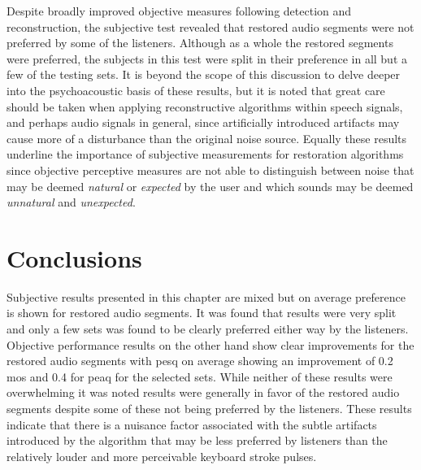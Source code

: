 
Despite broadly improved objective measures following detection and reconstruction, the subjective test revealed that restored audio segments were not preferred by some of the listeners. Although as a whole the restored segments were preferred, the subjects in this test were split in their preference in all but a few of the testing sets. It is beyond the scope of this discussion to delve deeper into the psychoacoustic basis of these results, but it is noted that great care should be taken when applying reconstructive algorithms within speech signals, and perhaps audio signals in general, since artificially introduced artifacts may cause more of a disturbance than the original noise source. Equally these results underline the importance of subjective measurements for restoration algorithms since objective perceptive measures are not able to distinguish between noise that may be deemed \emph{natural} or \emph{expected} by the user and which sounds may be deemed \emph{unnatural} and \emph{unexpected}.

\section{Conclusions}\label{sec:RestorationResults}
Subjective results presented in this chapter are mixed but on average preference is shown for restored audio segments. It was found that results were very split and only a few sets was found to be clearly preferred either way by the listeners. Objective performance results on the other hand show clear improvements for the restored audio segments with \DIFdelbegin {}\DIFdelend \DIFaddbegin \gls{pesq} \DIFaddend on average showing an improvement of 0.2 \DIFdelbegin {}\DIFdelend \DIFaddbegin \gls{mos} \DIFaddend and 0.4 for \DIFdelbegin {}\DIFdelend \DIFaddbegin \gls{peaq} \DIFaddend for the selected sets. While neither of these results were overwhelming it was noted results were generally in favor of the restored audio segments despite some of these not being preferred by the listeners. These results indicate that there is a nuisance factor associated with the subtle artifacts introduced by the algorithm that may be less preferred by listeners than the relatively louder and more perceivable keyboard stroke pulses. 

